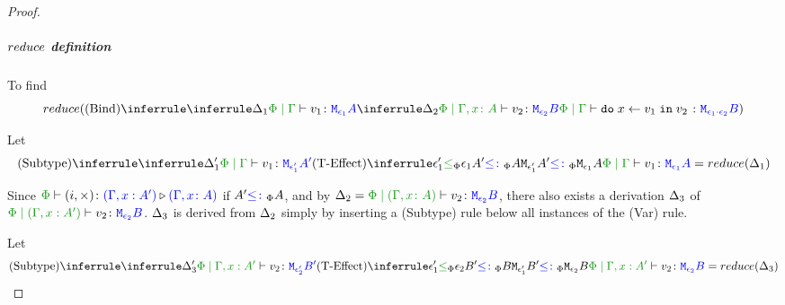 \documentclass{report}
\begin{document}
\begin{framed}
\begin{proof}
        
                        \case{\vbind}
                        \subparagraph{$reduce$ definition}
        
                        To find
                        \begin{equation}
                            \reduce(
                                \ntreeruleII{\vbind}{
                                    \treeruleI{
                                        \D_1
                                    }{
                                        \gpetyperelation{v_1}{\M{\e_1}{A}}
                                    }
                                    }{
                                    \treeruleI{
                                        \D_2
                                    }{
                                        \etyperelation{\P}{\gax}{v_2}{\M{\e_2}{B}}
                                    }
                                } {
                                    \gpetyperelation{\doin{x}{v_1}{v_2}}{\M{\e_1\dot\e_2}{B}}
                                }
                            )
                        \end{equation}
        
        
                        Let \begin{equation}
                            \ntreeruleII{\vsubtype}{
                                \treeruleI{\D'_1}{\gpetyperelation{v_1}{\M{\e'_1}{A'}}}
                            }{
                            \subeffecttreep{\e_1'}{A'}{\e_1}{A}
                            }{
                                \gpetyperelation{v_1}{\M{\e_1}{A}}
                            } = \reduce(\D_1)
                        \end{equation}
        
                        Since $\ewrel{\P}{(i,\x)}{(\G, x: A')}{(\gax)}$ if $A' {\color{blue} \leq\colon}_\Phi A$, and by $\D_2 = \etyperelation{\P}{(\gax)}{v_2}{\M{\e_2}{B}}$, there also exists a derivation $\Delta_3$ of $\etyperelation{\P}{(\G, x: A')}{v_2}{\M{\e_2}{B}}$. $\Delta_3$ is derived from $\Delta_2$ simply by inserting a (Subtype) rule below all instances of the (Var) rule.
        
                        Let \begin{equation}
                            \ntreeruleII{\vsubtype}{
                                \treeruleI{\D'_3}{\etyperelation{\P}{\G, x: A'}{v_2}{\M{\e'_2}{B'}}}
                            }{
                            \subeffecttreep{\e_1'}{B'}{\e_2}{B}
                            }{
                                \etyperelation{\P}{\G, x: A'}{v_2}{\M{\e_2}{B}}
                            } = \reduce(\D_3)
                        \end{equation}
                        

\end{proof}
\end{framed}
\end{document}

